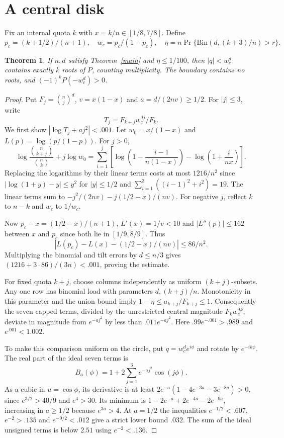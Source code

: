 \documentclass[11pt]{article}
\newtheorem{theorem}{Theorem}
\begin{document}
\section{A central disk}
Fix an internal quota $k$ with $x=k/n\in[1/8,7/8]$. Define
\[
 p_c=(k+1/2)/(n+1),\quad w_c=p_c/(1-p_c),\quad
 \eta=n\Pr\{\mathrm{Bin}(d,(k+3)/n)>r\}.
\]
\begin{theorem}\label{disk}
If $n,d$ satisfy Theorem~\ref{main} and $\eta\le1/100$, then $|q|<w_c^d$ contains exactly $k$ roots of $P$, counting multiplicity. The boundary contains no roots, and $(-1)^k P(-w_c^d)>0$.
\end{theorem}
\begin{proof}
Put $F_j=\binom nj^d$, $v=x(1-x)$ and $a=d/(2nv)\ge1/2$. For $|j|\le3$, write
\[
 T_j=F_{k+j} w_c^{dj}/F_k .
\]
We first show $|\log T_j+aj^2|<.001$. Let $w_0=x/(1-x)$ and $L(p)=\log(p/(1-p))$. For $j>0$,
\[
 \log\frac{\binom n{k+j}}{\binom nk}+j\log w_0
 =\sum_{i=1}^j\left[\log\left(1-\frac{i-1}{n(1-x)}\right)
 -\log\left(1+\frac{i}{nx}\right)\right].
\]
Replacing the logarithms by their linear terms costs at most $1216/n^2$ since $|\log(1+y)-y|\le y^2$ for $|y|\le1/2$ and $\sum_{i=1}^3((i-1)^2+i^2)=19$. The linear terms sum to $-j^2/(2nv)-j(1/2-x)/(nv)$. For negative $j$, reflect $k$ to $n-k$ and $w_c$ to $1/w_c$.

Now $p_c-x=(1/2-x)/(n+1)$, $L'(x)=1/v<10$ and $|L''(p)|\le162$ between $x$ and $p_c$ since both lie in $[1/9,8/9]$. Thus
\[
 \left|L(p_c)-L(x)-(1/2-x)/(nv)\right|\le86/n^2 .
\]
Multiplying the binomial and tilt errors by $d\le n/3$ gives $(1216+3\cdot86)/(3n)<.001$, proving the estimate.

For fixed quota $k+j$, choose columns independently as uniform $(k+j)$-subsets. Any one row has binomial load with parameters $d,(k+j)/n$. Monotonicity in this parameter and the union bound imply $1-\eta\le a_{k+j}/F_{k+j}\le1$. Consequently the seven capped terms, divided by the unrestricted central magnitude $F_kw_c^{dk}$, deviate in magnitude from $e^{-aj^2}$ by less than $.011e^{-aj^2}$. Here $.99e^{-.001}>.989$ and $e^{.001}<1.002$.

To make this comparison uniform on the circle, put $q=w_c^de^{i\phi}$ and rotate by $e^{-ik\phi}$. The real part of the ideal seven terms is
\[
 B_a(\phi)=1+2\sum_{j=1}^3 e^{-aj^2}\cos(j\phi).
\]
As a cubic in $u=\cos\phi$, its derivative is at least $2e^{-a}(1-4e^{-3a}-3e^{-8a})>0$, since $e^{3/2}>40/9$ and $e^4>30$. Its minimum is $1-2e^{-a}+2e^{-4a}-2e^{-9a}$, increasing in $a\ge1/2$ because $e^{3a}>4$. At $a=1/2$ the inequalities $e^{-1/2}<.607$, $e^{-2}>.135$ and $e^{-9/2}<.012$ give a strict lower bound $.032$. The sum of the ideal unsigned terms is below $2.51$ using $e^{-2}<.136$.


\end{proof}
\end{document}
